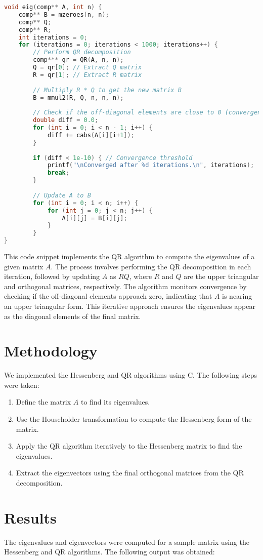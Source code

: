 \documentclass[journal,12pt,onecolumn]{IEEEtran}
\theoremstyle{remark}
\begin{document}
\begin{lstlisting}[language=C]
void eig(comp** A, int n) {
	comp** B = mzeroes(n, n);
	comp** Q;
	comp** R;
	int iterations = 0;
	for (iterations = 0; iterations < 1000; iterations++) {
		// Perform QR decomposition
		comp*** qr = QR(A, n, n);
		Q = qr[0]; // Extract Q matrix
		R = qr[1]; // Extract R matrix
		
		// Multiply R * Q to get the new matrix B
		B = mmul2(R, Q, n, n, n);
		
		// Check if the off-diagonal elements are close to 0 (convergence)
		double diff = 0.0;
		for (int i = 0; i < n - 1; i++) {
			diff += cabs(A[i][i+1]);
		}
		
		if (diff < 1e-10) { // Convergence threshold
			printf("\nConverged after %d iterations.\n", iterations);
			break;
		}
		
		// Update A to B
		for (int i = 0; i < n; i++) {
			for (int j = 0; j < n; j++) {
				A[i][j] = B[i][j];
			}
		}
}
\end{lstlisting}
This code snippet implements the QR algorithm to compute the eigenvalues of a given matrix \( A \). The process involves performing the QR decomposition in each iteration, followed by updating \( A \) as \( RQ \), where \( R \) and \( Q \) are the upper triangular and orthogonal matrices, respectively. The algorithm monitors convergence by checking if the off-diagonal elements approach zero, indicating that \( A \) is nearing an upper triangular form. This iterative approach ensures the eigenvalues appear as the diagonal elements of the final matrix.

\newpage
	\section{Methodology}
	We implemented the Hessenberg and QR algorithms using C. The following steps were taken:
	\begin{enumerate}
		\item Define the matrix \( A \) to find its eigenvalues.
		\item Use the Householder transformation to compute the Hessenberg form of the matrix.
		\item Apply the QR algorithm iteratively to the Hessenberg matrix to find the eigenvalues.
		\item Extract the eigenvectors using the final orthogonal matrices from the QR decomposition.
	\end{enumerate}

\section{Results}
The eigenvalues and eigenvectors were computed for a sample matrix using the Hessenberg and QR algorithms. The following output was obtained:
\end{document}
